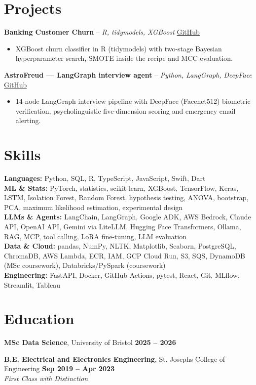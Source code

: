 \documentclass[a4paper,10pt]{article}
\begin{document}
\section{Projects}
\noindent\textbf{Banking Customer Churn} -- \textit{R, tidymodels, XGBoost} \hfill \href{https://github.com/Thiruvel-AP/Banking-Customer-Churn-Prediction}{GitHub}
\begin{itemize}
  \item XGBoost churn classifier in R (tidymodels) with two-stage Bayesian hyperparameter search, SMOTE inside the recipe and MCC evaluation.
\end{itemize}
\noindent\textbf{AstroFreud — LangGraph interview agent} -- \textit{Python, LangGraph, DeepFace} \hfill \href{https://github.com/Thiruvel-AP/AstroFreud}{GitHub}
\begin{itemize}
  \item 14-node LangGraph interview pipeline with DeepFace (Facenet512) biometric verification, psycholinguistic five-dimension scoring and emergency email alerting.
\end{itemize}

\section{Skills}
\textbf{Languages:} Python, SQL, R, TypeScript, JavaScript, Swift, Dart\\
\textbf{ML \& Stats:} PyTorch, statistics, scikit-learn, XGBoost, TensorFlow, Keras, LSTM, Isolation Forest, Random Forest, hypothesis testing, ANOVA, bootstrap, PCA, maximum likelihood estimation, experimental design\\
\textbf{LLMs \& Agents:} LangChain, LangGraph, Google ADK, AWS Bedrock, Claude API, OpenAI API, Gemini via LiteLLM, Hugging Face Transformers, Ollama, RAG, MCP, tool calling, LoRA fine-tuning, LLM evaluation\\
\textbf{Data \& Cloud:} pandas, NumPy, NLTK, Matplotlib, Seaborn, PostgreSQL, ChromaDB, AWS Lambda, ECR, IAM, GCP Cloud Run, S3, SQS, DynamoDB (MSc coursework), Databricks/PySpark (coursework)\\
\textbf{Engineering:} FastAPI, Docker, GitHub Actions, pytest, React, Git, MLflow, Streamlit, Tableau

\section{Education}
\textbf{MSc Data Science}, University of Bristol \hfill \textbf{2025 – 2026}\par
\vspace{2pt}
\textbf{B.E. Electrical and Electronics Engineering}, St. Joseph\textquotesingle{}s College of Engineering \hfill \textbf{Sep 2019 – Apr 2023}\\ \textit{First Class with Distinction}\par
\end{document}
